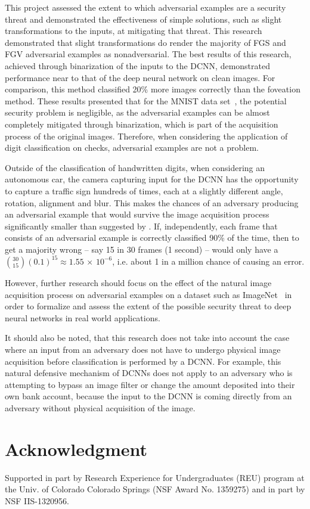 \documentclass[conference]{IEEEtran}
\begin{document}
This project assessed the extent to which adversarial examples are a security threat and demonstrated the effectiveness of simple solutions, such as slight transformations to the inputs, at mitigating that threat.  This research demonstrated that slight transformations do render the majority of FGS and FGV adversarial examples as nonadversarial.  The best results of this research, achieved through binarization of the inputs to the DCNN, demonstrated performance near to that of the deep neural network on clean images.  For comparison, this method classified 20\% more images correctly than the foveation method.  These results presented that for the MNIST data set~\cite{c9}, the potential security problem is negligible, as the adversarial examples can be almost completely mitigated through binarization, which is part of the acquisition process of the original images.  Therefore, when considering the application of digit classification on checks, adversarial examples are not a problem.\par  
Outside of the classification of handwritten digits, when considering an autonomous car, the camera capturing input for the DCNN has the opportunity to capture a traffic sign hundreds of times, each at a slightly different angle, rotation, alignment and blur.  This makes the chances of an adversary producing an adversarial example that would survive the image acquisition process significantly smaller than suggested by \cite{c23}.  If, independently, each frame that consists of an adversarial example is correctly classified 90\% of the time, then to get a majority wrong -- say 15 in 30 frames (1 second) -- would only have a ${30 \choose 15}(0.1)^{15} \approx 1.55\,\times\,10^{-6}$, i.e. about 1 in a million chance of causing an error.  \par
However, further research should focus on the effect of the natural image acquisition process on adversarial examples on a dataset such as ImageNet~\cite{c17} in order to formalize and assess the extent of the possible security threat to deep neural networks in real world applications.\par

It should also be noted, that this research does not take into account the case where an input from an adversary does not have to undergo physical image acquisition before classification is performed by a DCNN.  For example, this natural defensive mechanism of DCNNs does not apply to an adversary who is attempting to bypass an image filter or change the amount deposited into their own bank account, because the input to the DCNN is coming directly from an adversary without physical acquisition of the image.


\section*{Acknowledgment}

Supported in part by Research Experience for Undergraduates (REU) program at the Univ. of Colorado Colorado Springs (NSF Award No. 1359275) and in part by NSF IIS-1320956.




\end{document}
